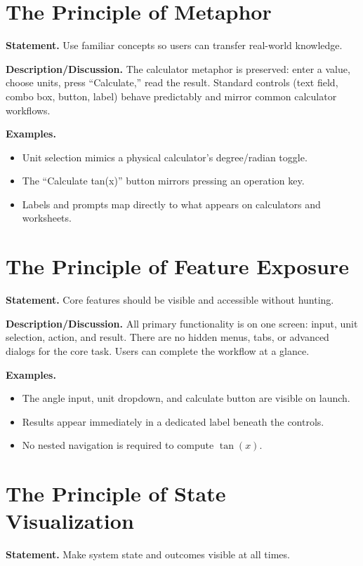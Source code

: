 \documentclass[11pt]{article}
\begin{document}
    \section{The Principle of Metaphor}
    \noindent\textbf{Statement.}
    Use familiar concepts so users can transfer real-world knowledge.

    \noindent\textbf{Description/Discussion.}
    The calculator metaphor is preserved: enter a value, choose units, press ``Calculate,'' read the result. Standard controls (text field, combo box, button, label) behave predictably and mirror common calculator workflows.

    \noindent\textbf{Examples.}
    \begin{itemize}
        \item Unit selection mimics a physical calculator's degree/radian toggle.
        \item The ``Calculate tan(x)'' button mirrors pressing an operation key.
        \item Labels and prompts map directly to what appears on calculators and worksheets.
    \end{itemize}

    \section{The Principle of Feature Exposure}
    \noindent\textbf{Statement.}
    Core features should be visible and accessible without hunting.

    \noindent\textbf{Description/Discussion.}
    All primary functionality is on one screen: input, unit selection, action, and result. There are no hidden menus, tabs, or advanced dialogs for the core task. Users can complete the workflow at a glance.

    \noindent\textbf{Examples.}
    \begin{itemize}
        \item The angle input, unit dropdown, and calculate button are visible on launch.
        \item Results appear immediately in a dedicated label beneath the controls.
        \item No nested navigation is required to compute $\tan(x)$.
    \end{itemize}

    \section{The Principle of State Visualization}
    \noindent\textbf{Statement.}
    Make system state and outcomes visible at all times.
\end{document}
